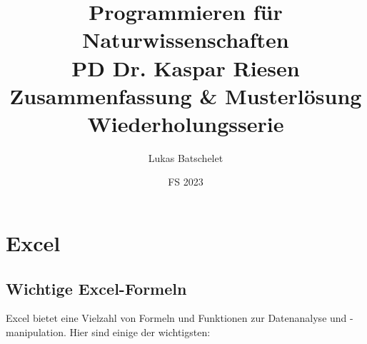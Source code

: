 \documentclass[11pt, oneside]{book}
\title{\sffamily Programmieren für Naturwissenschaften\\ \large PD Dr. Kaspar Riesen\\ \LARGE Zusammenfassung \& Musterlösung Wiederholungsserie}
\author{\sffamily Lukas Batschelet}
\date{\sffamily FS 2023}
\begin{document}
\maketitle

\tableofcontents

\chapter{Excel}

\section{Wichtige Excel-Formeln}

Excel bietet eine Vielzahl von Formeln und Funktionen zur Datenanalyse und -manipulation. Hier sind einige der wichtigsten:
\end{document}
